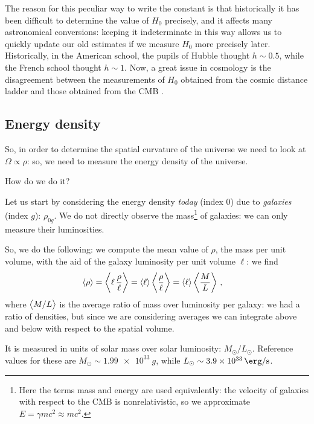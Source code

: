 \documentclass[main.tex]{subfiles}
\begin{document}
The reason for this peculiar way to write the constant is that historically it has been difficult to determine the value of \(H_0 \) precisely, and it affects many astronomical conversions: keeping it indeterminate in this way allows us to quickly update our old estimates if we measure \(H_0 \) more precisely later.
Historically, in the American school, the pupils of Hubble thought \(h \sim 0.5\), while the French school thought \(h \sim 1\).
Now, a great issue in cosmology is the disagreement between the measurements of \(H_0 \) obtained from the cosmic distance ladder and those obtained from the CMB \cite[]{Wong:2019}.

\subsection{Energy density}

So, in order to determine the spatial curvature of the universe we need to look at \(\Omega \propto \rho \): so, we need to measure the energy density of the universe.

How do we do it?

Let us start by considering the energy density \emph{today} (index 0) due to \emph{galaxies} (index \(g\)): \(\rho_{0g}\).
We do not directly observe the mass\footnote{Here the terms mass and energy are used equivalently: the velocity of galaxies with respect to the CMB is nonrelativistic, so we approximate \(E = \gamma m c^2 \approx m c^2\).}  
of galaxies: we can only measure their luminosities.

So, we do the following: we compute the mean value of \(\rho \), the mass per unit volume, with the aid of the galaxy luminosity per unit volume \(\ell\): we find 
%
\begin{align}
\expval{\rho }
&= \expval{\ell \,\frac{\rho }{\ell}} 
= \expval{\ell} \expval{\frac{\rho }{\ell}} 
= \expval{\ell} \expval{\frac{M}{L}}
\,,
\end{align}
%
where \(\expval{M  / L}\) is the average ratio of mass over luminosity per galaxy: we had a ratio of densities, but since we are considering averages we can integrate above and below with respect to the spatial volume.


It is measured in units of solar mass over solar luminosity: \(M_{\odot} / L_{\odot}\).
Reference values for these are \(M_{\odot} \sim \SI{1.99e33}{g}\), while \(L_\odot \sim \SI{3.9e33}{\erg\per\second} \).
\end{document}
